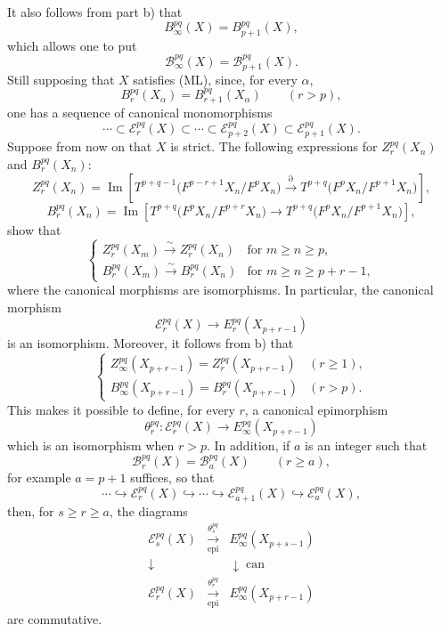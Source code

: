 \documentclass[11pt]{article}
\providecommand{\Im}{\operatorname{Im}}
\renewcommand{\Im}{\operatorname{Im}}
\providecommand{\Im}{\operatorname{Im}}
\providecommand{\can}{\operatorname{can}}
\providecommand{\epi}{\operatorname{epi}}
\begin{document}
It also follows from part b) that
\[
B_\infty^{pq}(X)=B_{p+1}^{pq}(X),
\]
which allows one to put
\[
\mathcal B_\infty^{pq}(X)=\mathcal B_{p+1}^{pq}(X).
\]
Still supposing that \(X\) satisfies (ML), since, for every \(\alpha\),
\[
B_r^{pq}(X_\alpha)=B_{r+1}^{pq}(X_\alpha)\qquad(r>p),
\]
one has a sequence of canonical monomorphisms
\begin{equation}
\cdots\subset\mathcal E_r^{pq}(X)\subset\cdots\subset\mathcal E_{p+2}^{pq}(X)\subset\mathcal E_{p+1}^{pq}(X).
\tag{S}\label{sga5:V:equation:s}
\end{equation}
Suppose from now on that \(X\) is strict. The following expressions for \(Z_r^{pq}(X_n)\) and \(B_r^{pq}(X_n)\):
\[
Z_r^{pq}(X_n)=
\Im\!\left[
T^{p+q-1}\bigl(F^{p-r+1}X_n/F^pX_n\bigr)
\xrightarrow{\partial}
T^{p+q}\bigl(F^pX_n/F^{p+1}X_n\bigr)
\right],
\]
\[
B_r^{pq}(X_n)=
\Im\!\left[
T^{p+q}\bigl(F^pX_n/F^{p+r}X_n\bigr)
\longrightarrow
T^{p+q}\bigl(F^pX_n/F^{p+1}X_n\bigr)
\right],
\]
show that
\begin{equation}
\left\{
\begin{array}{ll}
Z_r^{pq}(X_m)\xrightarrow{\sim}Z_r^{pq}(X_n)&\text{for }m\ge n\ge p,\\[3pt]
B_r^{pq}(X_m)\xrightarrow{\sim}B_r^{pq}(X_n)&\text{for }m\ge n\ge p+r-1,
\end{array}
\right.
\tag{\(d_1\)}\label{sga5:V:equation:d-1}
\end{equation}
where the canonical morphisms are isomorphisms. In particular, the canonical morphism
\[
\mathcal E_r^{pq}(X)\longrightarrow E_r^{pq}(X_{p+r-1})
\]
is an isomorphism. Moreover, it follows from b) that
\begin{equation}
\left\{
\begin{array}{ll}
Z_\infty^{pq}(X_{p+r-1})=Z_r^{pq}(X_{p+r-1})&(r\ge1),\\[3pt]
B_\infty^{pq}(X_{p+r-1})=B_r^{pq}(X_{p+r-1})&(r>p).
\end{array}
\right.
\tag{\(d_2\)}\label{sga5:V:equation:d-2}
\end{equation}
This makes it possible to define, for every \(r\), a canonical epimorphism
\[
\theta_r^{pq}:\mathcal E_r^{pq}(X)\longrightarrow E_\infty^{pq}(X_{p+r-1})
\]
which is an isomorphism when \(r>p\). In addition, if \(a\) is an integer such that
\[
\mathcal B_r^{pq}(X)=\mathcal B_a^{pq}(X)\qquad(r\ge a),
\]
for example \(a=p+1\) suffices, so that
\begin{equation}
\cdots\hookrightarrow\mathcal E_r^{pq}(X)\hookrightarrow\cdots\hookrightarrow
\mathcal E_{a+1}^{pq}(X)\hookrightarrow\mathcal E_a^{pq}(X),
\tag{S bis}\label{sga5:V:equation:s-bis}
\end{equation}
then, for \(s\ge r\ge a\), the diagrams
\begin{equation}
\begin{array}{ccc}
\mathcal E_s^{pq}(X)&\xrightarrow[\epi]{\theta_s^{pq}}&E_\infty^{pq}(X_{p+s-1})\\
\downarrow&&\downarrow\can\\
\mathcal E_r^{pq}(X)&\xrightarrow[\epi]{\theta_r^{pq}}&E_\infty^{pq}(X_{p+r-1})
\end{array}
\tag{\(d_3\)}\label{sga5:V:equation:d-3}
\end{equation}
are commutative.
\end{document}
